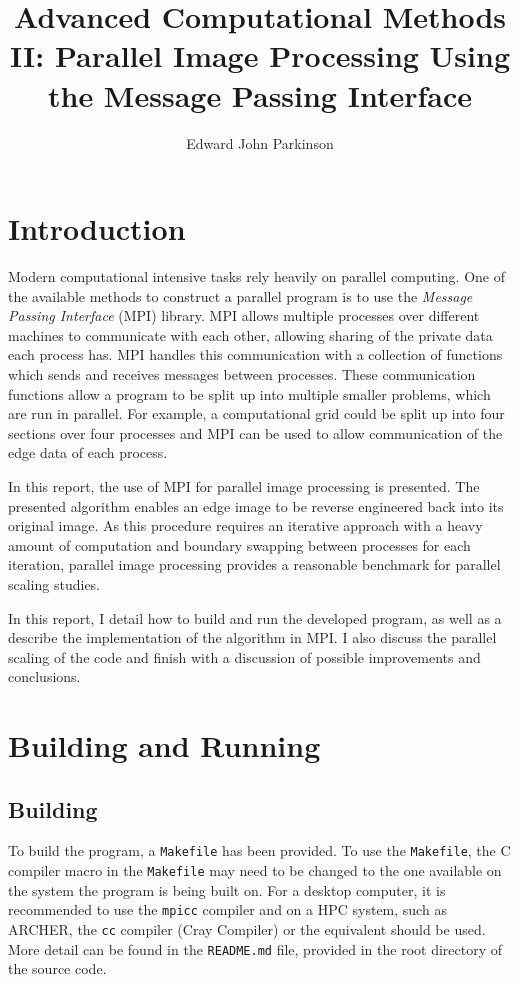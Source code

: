 \documentclass[11pt, a4paper]{article}
\begin{document}
	\title{Advanced Computational Methods II: Parallel Image Processing Using the Message Passing Interface}
	\author{Edward John Parkinson}
	\maketitle	
	
	\section{Introduction}
		Modern computational intensive tasks rely heavily on parallel computing. One of the available methods to construct a parallel program is to use the \textit{Message Passing Interface} (MPI) library. MPI allows multiple processes over different machines to communicate with each other, allowing sharing of the private data each process has. MPI handles this communication with a collection of functions which sends and receives messages between processes. These communication functions allow a program to be split up into multiple smaller problems, which are run in parallel. For example, a computational grid could be split up into four sections over four processes and MPI can be used to allow communication of the edge data of each process. 
		
		In this report, the use of MPI for parallel image processing is presented. The presented algorithm enables an edge image to be reverse engineered back into its original image. As this procedure requires an iterative approach with a heavy amount of computation and boundary swapping between processes for each iteration, parallel image processing provides a reasonable benchmark for parallel scaling studies.
		
		In this report, I detail how to build and run the developed program, as well as a describe the implementation of the algorithm in MPI. I  also discuss the parallel scaling of the code and finish with a discussion of possible improvements and conclusions.
	
	\section{Building and Running}
		\subsection{Building}
			To build the program, a \texttt{Makefile} has been provided. To use the \texttt{Makefile}, the C compiler macro in the \texttt{Makefile} may need to be changed to the one available on the system the program is being built on. For a desktop computer, it is recommended to use the \texttt{mpicc} compiler and on a HPC system, such as ARCHER, the \texttt{cc} compiler (Cray Compiler) or the equivalent should be used. More detail can be found in the \texttt{README.md} file, provided in the root directory of the source code.
		
\end{document}

